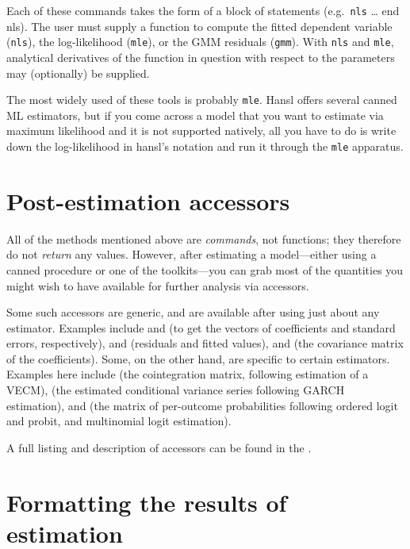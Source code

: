 Each of these commands takes the form of a block of statements (e.g.\
\texttt{nls} \dots{} \textrm{end nls}). The user must supply a
function to compute the fitted dependent variable (\texttt{nls}), the
log-likelihood (\texttt{mle}), or the GMM residuals
(\texttt{gmm}). With \texttt{nls} and \texttt{mle}, analytical
derivatives of the function in question with respect to the parameters
may (optionally) be supplied.

The most widely used of these tools is probably \texttt{mle}. Hansl
offers several canned ML estimators, but if you come across a model
that you want to estimate via maximum likelihood and it is not
supported natively, all you have to do is write down the
log-likelihood in hansl's notation and run it through the \texttt{mle}
apparatus.

\section{Post-estimation accessors}
\label{sec:postest-accessors}

All of the methods mentioned above are \textit{commands}, not
functions; they therefore do not \textit{return} any values. However,
after estimating a model---either using a canned procedure or one of
the toolkits---you can grab most of the quantities you might wish to
have available for further analysis via accessors.

Some such accessors are generic, and are available after using just
about any estimator. Examples include \dollar{coeff} and
 (to get the vectors of coefficients and standard
errors, respectively), \dollar{uhat} and \dollar{yhat} (residuals and
fitted values), and \dollar{vcv} (the covariance matrix of the
coefficients). Some, on the other hand, are specific to certain
estimators. Examples here include  (the cointegration
matrix, following estimation of a VECM), \dollar{h} (the estimated
conditional variance series following GARCH estimation), and
 (the matrix of per-outcome probabilities following
ordered logit and probit, and multinomial logit estimation).

A full listing and description of accessors can be found in the
\GCR.

\section{Formatting the results of estimation}
\label{sec:model-format}

